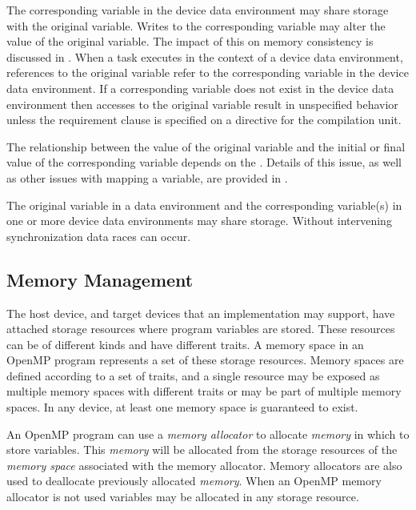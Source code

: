 The corresponding variable in the device data environment may share 
storage with the original variable. Writes to the corresponding 
variable may alter the value of the original variable. The impact 
of this on memory consistency is discussed in 
. When a task executes 
in the context of a device data environment, references to the 
original variable refer to the corresponding variable in the device 
data environment. If a corresponding variable does not exist in the 
device data environment then accesses to the original variable result 
in unspecified behavior unless the  
requirement clause is specified on a  directive for 
the compilation unit.

The relationship between the value of the original variable and the 
initial or final value of the corresponding variable depends on the 
. Details of this issue, as well as other issues with 
mapping a variable, are provided in .

The original variable in a data environment and the corresponding 
variable(s) in one or more device data environments may share storage. 
Without intervening synchronization data races can occur.

\subsection{Memory Management}
The host device, and target devices that an implementation may support, 
have attached storage resources where program variables are stored. 
These resources can be of different kinds and have different traits. 
A memory space in an OpenMP program represents a set of these storage 
resources. Memory spaces are defined according to a set of traits, and 
a single resource may be exposed as multiple memory spaces with different 
traits or may be part of multiple memory spaces. In any device, at least 
one memory space is guaranteed to exist.

An OpenMP program can use a \emph{memory allocator} to allocate \emph{memory} 
in which to store variables. This \emph{memory} will be allocated from the 
storage resources of the \emph{memory space} associated with the memory 
allocator. Memory allocators are also used to deallocate previously allocated
\emph{memory}. When an OpenMP memory allocator is not used variables may be 
allocated in any storage resource.


